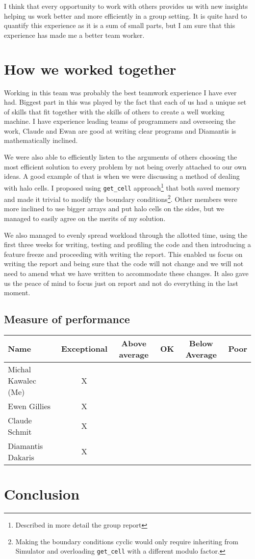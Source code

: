 \documentclass[11pt,a4paper]{article}
\begin{document}
I think that every opportunity to work with others provides us with new insights helping us work better and more efficiently in a group setting. It is quite hard to quantify this experience as it is a sum of small parts, but I am sure that this experience has made me a better team worker.

\section{How we worked together}
Working in this team was probably the best teamwork experience I have ever had. Biggest part in this was played by the fact that each of us had a unique set of skills that fit together with the skills of others to create a well working machine. I have experience leading teams of programmers and overseeing the work, Claude and Ewan are good at writing clear programs and Diamantis is mathematically inclined.

We were also able to efficiently listen to the arguments of others choosing the most efficient solution to every problem by not being overly attached to our own ideas. 
A good example of that is when we were discussing a method of dealing with halo cells. 
I proposed using \texttt{get\_cell} approach\footnote{Described in more detail the group report} that both saved memory and made it trivial to modify the boundary conditions\footnote{Making the boundary conditions cyclic would only require inheriting from Simulator and overloading \texttt{get\_cell} with a different modulo factor.}. 
Other members were more inclined to use bigger arrays and put halo cells on the sides, but we managed to easily agree on the merits of my solution. 

We also managed to evenly spread workload through the allotted time, using the first three weeks for writing, testing and profiling the code and then introducing a feature freeze and proceeding with writing the report. This enabled us focus on writing the report and being sure that the code will not change and we will not need to amend what we have written to accommodate these changes. It also gave us the peace of mind to focus just on report and not do everything in the last moment.

\subsection{Measure of performance}
\begin{tabular}{|l||c|c|c|c|c|}
    \hline
    Name & Exceptional & Above average & OK & Below Average & Poor \\
    \hline \hline
    Michal Kawalec (Me)& X & & & & \\
    \hline
    Ewen Gillies & X & & & & \\
    \hline 
    Claude Schmit & X & & & & \\ 
    \hline
    Diamantis Dakaris & X & & & & \\
    \hline
\end{tabular}

\section{Conclusion}
\end{document}
